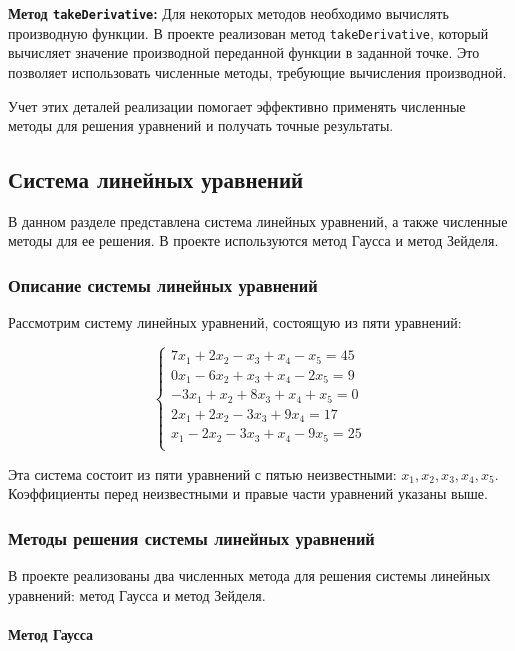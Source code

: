 \documentclass[12pt]{article}
\begin{document}
\textbf{Метод \texttt{takeDerivative}:}
Для некоторых методов необходимо вычислять производную функции. В проекте реализован метод \texttt{takeDerivative}, который вычисляет значение производной переданной функции в заданной точке. Это позволяет использовать численные методы, требующие вычисления производной.

Учет этих деталей реализации помогает эффективно применять численные методы для решения уравнений и получать точные результаты.

\subsection{Система линейных уравнений}

В данном разделе представлена система линейных уравнений, а также численные методы для ее решения. В проекте используются метод Гаусса и метод Зейделя.

\subsubsection{Описание системы линейных уравнений}

Рассмотрим систему линейных уравнений, состоящую из пяти уравнений:

\begin{center}
\[
\begin{cases}
7x_1 + 2x_2 - x_3 + x_4 - x_5 = 45 \\
0x_1 - 6x_2 + x_3 + x_4 - 2x_5 = 9 \\
-3x_1 + x_2 + 8x_3 + x_4 + x_5 = 0 \\
2x_1 + 2x_2 - 3x_3 + 9x_4 = 17 \\
x_1 - 2x_2 - 3x_3 + x_4 - 9x_5 = 25 \\
\end{cases}
\]
\end{center}

Эта система состоит из пяти уравнений с пятью неизвестными: $x_1, x_2, x_3, x_4, x_5$. Коэффициенты перед неизвестными и правые части уравнений указаны выше.

\subsubsection{Методы решения системы линейных уравнений}

В проекте реализованы два численных метода для решения системы линейных уравнений: метод Гаусса и метод Зейделя.

\paragraph{Метод Гаусса}
\end{document}
